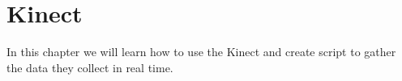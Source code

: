 \chapter{Kinect}

In this chapter we will learn how to use the Kinect and create script to gather the data they collect in real time.
